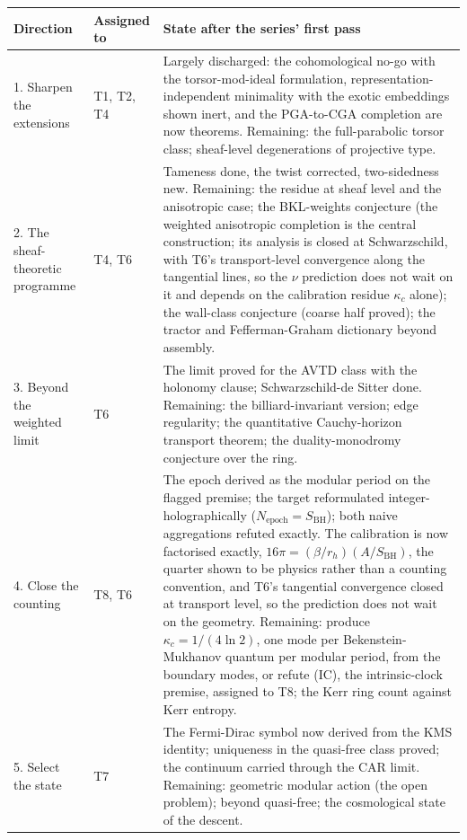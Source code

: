 \documentclass[11pt]{article}
\theoremstyle{definition}
\theoremstyle{plain}
\begin{document}
  \begin{longtable}{p{} p{} p{}}
\toprule
\textbf{Direction} & \textbf{Assigned to} & \textbf{State after the series' first pass} \\
\midrule
\endhead
1. Sharpen the extensions & T1, T2, T4 & Largely discharged: the cohomological no-go with the torsor-mod-ideal formulation, representation-independent minimality with the exotic embeddings shown inert, and the PGA-to-CGA completion are now theorems. Remaining: the full-parabolic torsor class; sheaf-level degenerations of projective type. \\
2. The sheaf-theoretic programme & T4, T6 & Tameness done, the twist corrected, two-sidedness new. Remaining: the residue at sheaf level and the anisotropic case; the BKL-weights conjecture (the weighted anisotropic completion is the central construction; its analysis is closed at Schwarzschild, with T6's transport-level convergence along the tangential lines, so the $\nu$ prediction does not wait on it and depends on the calibration residue $\kappa_{c}$ alone); the wall-class conjecture (coarse half proved); the tractor and Fefferman-Graham dictionary beyond assembly. \\
3. Beyond the weighted limit & T6 & The limit proved for the AVTD class with the holonomy clause; Schwarzschild-de Sitter done. Remaining: the billiard-invariant version; edge regularity; the quantitative Cauchy-horizon transport theorem; the duality-monodromy conjecture over the ring. \\
4. Close the counting & T8, T6 & The epoch derived as the modular period on the flagged premise; the target reformulated integer-holographically ($N_{\mathrm{epoch}} = S_{\mathrm{BH}}$); both naive aggregations refuted exactly. The calibration is now factorised exactly, $16\pi = (\beta/r_{h})(A/S_{\mathrm{BH}})$, the quarter shown to be physics rather than a counting convention, and T6's tangential convergence closed at transport level, so the prediction does not wait on the geometry. Remaining: produce $\kappa_{c} = 1/(4\ln 2)$, one mode per Bekenstein-Mukhanov quantum per modular period, from the boundary modes, or refute (IC), the intrinsic-clock premise, assigned to T8; the Kerr ring count against Kerr entropy. \\
5. Select the state & T7 & The Fermi-Dirac symbol now derived from the KMS identity; uniqueness in the quasi-free class proved; the continuum carried through the CAR limit. Remaining: geometric modular action (the open problem); beyond quasi-free; the cosmological state of the descent. \\

\end{longtable}
\end{document}
